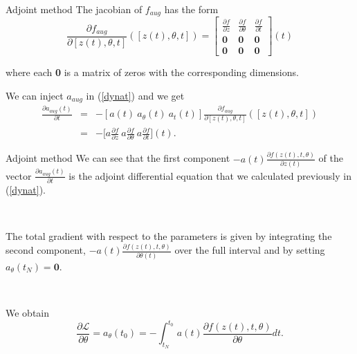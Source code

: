 \documentclass[11pt]{beamer}
\begin{document}
\begin{frame}{Adjoint method}
The jacobian of $f_{aug}$ has the form
\begin{equation*}
\frac{\partial f_{aug}}{\partial [z(t),\theta,t]}([z(t),\theta,t]) = \begin{bmatrix}
\frac{\partial f}{\partial z} & \frac{\partial f}{\partial \theta} & \frac{\partial f}{\partial t} \\
\textbf{0} & \textbf{0} & \textbf{0} \\
\textbf{0} & \textbf{0} & \textbf{0}
\end{bmatrix}(t)
\end{equation*}

where each \textbf{0} is a matrix of zeros with the corresponding dimensions.

We can inject $a_{aug}$ in (\ref{dynat}) and we get
\begin{eqnarray*}
\frac{\partial a_{aug}(t)}{\partial t} 
&=& - [a(t) \ a_\theta (t) \ a_t (t)]\frac{\partial f_{aug}}{\partial [ z(t),\theta , t]}([z(t),\theta , t]) \\
&=& -\Big[a\frac{\partial f}{\partial z} \ a\frac{\partial f}{\partial \theta} \ a\frac{\partial  f}{\partial t}\Big] (t).
\end{eqnarray*}
\end{frame}

\begin{frame}{Adjoint method}
We can see that the first component $-a(t)\frac{\partial f(z(t),t,\theta)}{\partial z(t)}$ of the vector $\frac{\partial a_{aug}(t)}{\partial t}$ is the adjoint differential equation that we calculated previously in (\ref{dynat}). 

~

The total gradient with respect to the parameters is given by integrating the second component, $-a(t)\frac{\partial f(z(t),t,\theta)}{\partial \theta(t)}$ over the full interval and by setting $a_\theta (t_N) = \textbf{0}$. 

~

We obtain 
\begin{equation*}
\frac{\partial \mathcal{L}}{\partial \theta} = a_\theta (t_0) = - \int_{t_N}^{t_0} a(t) \frac{\partial f(z(t),t,\theta)}{\partial \theta} dt.
\end{equation*}
\end{frame}
\end{document}
